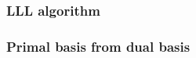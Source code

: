 \documentclass[12pt]{article}
\begin{document}
\subsubsection{LLL algorithm}


\subsubsection{Primal basis from dual basis}
\end{document}
